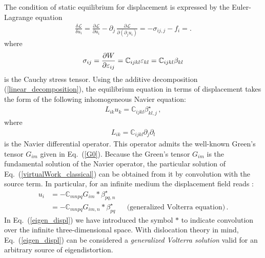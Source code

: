 The condition of static equilibrium  for displacement is expressed by the Euler-Lagrange equation
\begin{align}
\label{EL-u}
\frac{\delta \mathcal{L}}{\delta u_i}
=\frac{\partial \mathcal{L}}{\partial u_i}
-\partial_j\, \frac{\partial \mathcal{L}}{\partial (\partial_j u_i)}
=-\sigma_{ij,j}-f_i
=.
\end{align}
where 
\begin{align}
\label{HL0}
\sigma_{ij}=\frac{\partial W}{\partial\varepsilon_{ij}}=\mathbb{C}_{ijkl}\varepsilon_{kl}=\mathbb{C}_{ijkl}\beta_{kl}
\end{align}
 is the Cauchy stress tensor. Using the additive decomposition
 (\ref{linear_decomposition}), the equilibrium equation in terms of
 displacement takes the form of the following inhomogeneous Navier equation:
\begin{align}
L_{ik}u_k=\mathbb{C}_{ijkl}\beta^\star_{kl,j}\,,
\label{virtualWork_classical}
\end{align}
where
\begin{align}
L_{ik}=\mathbb{C}_{ijkl}\partial_j\partial_l
\end{align} 
is the Navier differential operator. This operator admits the well-known Green's  tensor $G_{im}$ given in Eq.~(\ref{G0}). Because the Green's  tensor $G_{im}$ is the fundamental solution of the Navier operator, the particular solution of Eq.~(\ref{virtualWork_classical}) can be obtained from it by convolution with the source term. In particular, for an infinite medium the displacement field reads \cite[]{Mura:1987wt}: 
\begin{align}
u_{i}&= - \mathbb{C}_{mnpq}G_{im}*\beta^\star_{pq,n} \nonumber\\
&=- \mathbb{C}_{mnpq}G_{im,n}*\beta^\star_{pq}  && \text{(generalized Volterra equation)}\,.
\label{eigen_displ} 
\end{align}
In Eq.~(\ref{eigen_displ}) we have introduced the symbol $*$ to indicate convolution over the infinite three-dimensional space. 
With dislocation theory in mind, Eq.~(\ref{eigen_displ}) can be considered a \textit{generalized Volterra solution} valid for an arbitrary source of eigendistortion. 

